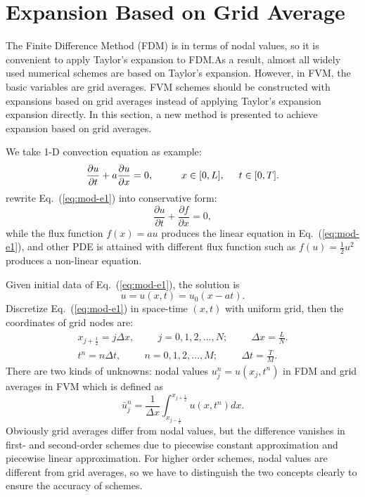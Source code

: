 \documentclass[]{article}
\newcommand{\diff}{d}
\def\jph{{j+\frac{1}{2}}}
\def\jmh{{j-\frac{1}{2}}}
\begin{document}
\section{Expansion Based on Grid Average}\label{sec:expansion-based-grid}

The Finite Difference Method (FDM) is in terms of nodal values,
so it is convenient to apply Taylor's expansion to FDM.\@ As a result,
almost all widely used numerical schemes are based on Taylor's expansion. 
However, in FVM, the basic variables are grid averages.  FVM schemes should
be constructed with expansions based on grid averages
instead of applying Taylor's expansion expansion directly. 
In this section, a new method is presented to achieve expansion based on grid
averages.

We take 1-D convection equation as example:
\begin{equation}
\dfrac{\partial u}{\partial t}+a\dfrac{\partial
u}{\partial x}=0,\hspace{1cm}x\in [0,L],\hspace{5mm} t\in [0,T].
\label{eq:mod-e1} 
\end{equation}
rewrite Eq.~(\ref{eq:mod-e1}) into conservative form:
\begin{equation}
\dfrac{\partial u}{\partial t}+\dfrac{\partial f
}{\partial x}=0,
\label{eq:conservative-convection}
\end{equation}
while the flux function $f(x) =au$ produces the linear equation in
Eq.~(\ref{eq:mod-e1}), and other PDE is attained with different flux
function such as $f(u) = \frac 12 u^2$ produces a non-linear equation.

Given initial data of Eq.~(\ref{eq:mod-e1}), the solution is
\begin{equation*}
u = u(x,t) = u_0(x-at).
\end{equation*}
Discretize Eq.~(\ref{eq:mod-e1}) in space-time $(x, t)$ with uniform grid,
then the coordinates of grid nodes are:
\begin{align*}
x_\jph=j \Delta x,\hspace{1cm} j=0,1,2,\ldots,N;\hspace{1cm} \Delta x
=\frac{L}{N}. \\
t^n = n\Delta t,\hspace{1cm} n=0,1,2,\ldots,M;\hspace{1cm} \Delta t
=\frac{T}{M}.
\end{align*}
There are two kinds of unknowns: nodal values $u^n_j=u(x_j,t^n)$ in FDM
and grid averages in FVM which is defined as
\begin{equation}
\bar u_{j}^n = \frac{1}{\Delta x}\int_{x_{\jmh}}^{x_{\jph}}
u(x,t^n)\diff x.
\label{eq:def_grid_avg}
\end{equation}
Obviously grid averages differ from nodal values, but the difference
vanishes in first- and second-order schemes due to piecewise constant
approximation and piecewise linear approximation. For higher order
schemes, nodal values are different from grid averages, so we have to
distinguish the two concepts clearly to ensure the accuracy of
schemes.
\end{document}
